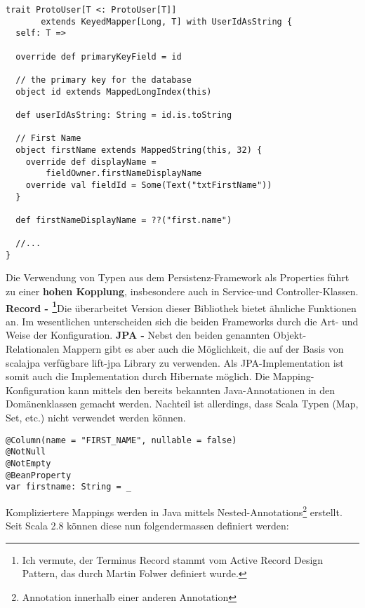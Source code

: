 \begin{lstlisting}[caption=Beispiel Mapping User Klasse mit Mapper]
trait ProtoUser[T <: ProtoUser[T]] 
       extends KeyedMapper[Long, T] with UserIdAsString {
  self: T =>

  override def primaryKeyField = id

  // the primary key for the database
  object id extends MappedLongIndex(this)

  def userIdAsString: String = id.is.toString

  // First Name
  object firstName extends MappedString(this, 32) {
    override def displayName = 
    	fieldOwner.firstNameDisplayName
    override val fieldId = Some(Text("txtFirstName"))
  }

  def firstNameDisplayName = ??("first.name")

  //...
} 
\end{lstlisting}
Die Verwendung von Typen aus dem Persistenz-Framework als Properties f\"uhrt zu einer \textbf{hohen Kopplung}\label{persistenz:kopplung}, insbesondere auch in Service-und Controller-Klassen.\newline\newline
\textbf{Record - \footnote{Ich vermute, der Terminus Record stammt vom Active Record Design Pattern, das durch Martin Folwer definiert wurde.}}Die \"uberarbeitet Version dieser Bibliothek bietet \"ahnliche Funktionen an. Im wesentlichen unterscheiden sich die beiden Frameworks durch die Art- und Weise der Konfiguration. \newline\newline
\textbf{JPA - }Nebst den beiden genannten Objekt-Relationalen Mappern gibt es aber auch die M\"oglichkeit, die auf der Basis von scalajpa verf\"ugbare lift-jpa Library zu verwenden. Als JPA-Implementation ist somit auch die Implementation durch Hibernate m\"oglich. Die Mapping-Konfiguration kann mittels den bereits bekannten Java-Annotationen in den Dom\"anenklassen gemacht werden. Nachteil ist allerdings, dass Scala Typen (Map, Set, etc.) nicht verwendet werden k\"onnen.
\begin{lstlisting}[caption=Property Mapping mit JPA]
@Column(name = "FIRST_NAME", nullable = false)
@NotNull
@NotEmpty
@BeanProperty
var firstname: String = _
\end{lstlisting}

Kompliziertere Mappings werden in Java mittels Nested-Annotations\footnote{Annotation innerhalb einer anderen Annotation} erstellt. Seit Scala 2.8 k\"onnen diese nun folgendermassen definiert werden:

